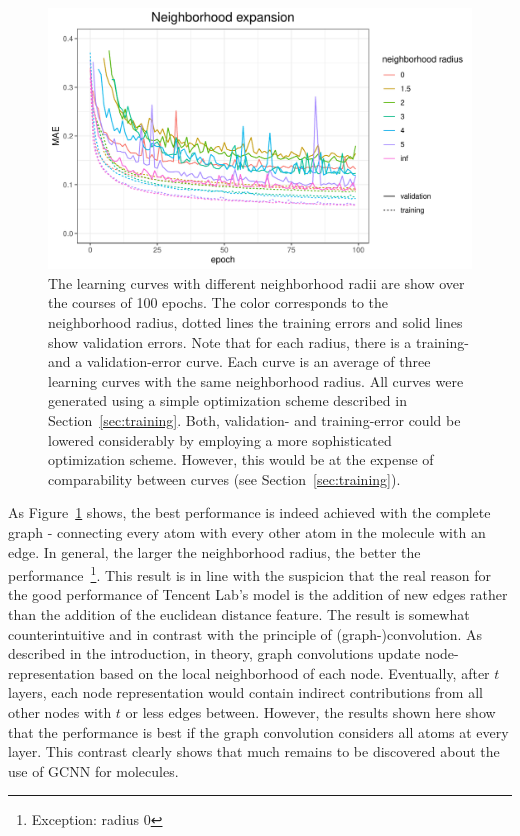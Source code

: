 \begin{figure}[H]
	\includegraphics[width=\linewidth]{figures/tencent-mpnn-neighborhood-expansion-old}
	
	\caption{The learning curves with different neighborhood radii are show over the courses of 100 epochs. The color corresponds to the neighborhood radius, dotted lines the training errors and solid lines show validation errors. Note that for each radius, there is a training- and a validation-error curve. Each curve is an average of three learning curves with the same neighborhood radius. All curves were generated using a simple optimization scheme described in Section~\ref{sec:training}. Both, validation- and training-error could be lowered considerably by employing a more sophisticated optimization scheme. However, this would be at the expense of comparability between curves (see Section~\ref{sec:training}).}
	\label{fig:tencent-mpnn-neighborhood-expansion}
\end{figure}

As Figure~\ref{fig:tencent-mpnn-neighborhood-expansion} shows, the best performance is indeed achieved with the complete graph - connecting every atom with every other atom in the molecule with an edge. In general, the larger the neighborhood radius, the better the performance~\footnote{Exception: radius 0}. This result is in line with the suspicion that the real reason for the good performance of Tencent Lab's model is the addition of new edges rather than the addition of the euclidean distance feature.
The result is somewhat counterintuitive and in contrast with the principle of (graph-)convolution. As described in the introduction, in theory, graph convolutions update node-representation based on the local neighborhood of each node. Eventually, after $t$ layers, each node representation would contain indirect contributions from all other nodes with $t$ or less edges between. However, the results shown here show that the performance is best if the graph convolution considers all atoms at every layer. This contrast clearly shows that much remains to be discovered about the use of GCNN for molecules.

